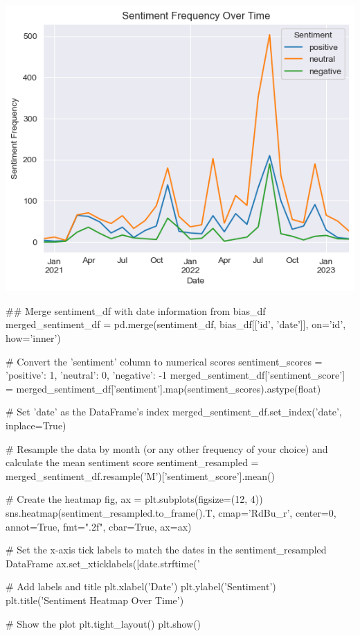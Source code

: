 \includegraphics[width=\textwidth]{./figs/fig_7.png}
\begin{pyin}
\## Merge sentiment_df with date information from bias_df
merged_sentiment_df = pd.merge(sentiment_df, bias_df[['id', 'date']], on='id', how='inner')

# Convert the 'sentiment' column to numerical scores
sentiment_scores = {'positive': 1, 'neutral': 0, 'negative': -1}
merged_sentiment_df['sentiment_score'] = merged_sentiment_df['sentiment'].map(sentiment_scores).astype(float)

# Set 'date' as the DataFrame's index
merged_sentiment_df.set_index('date', inplace=True)

# Resample the data by month (or any other frequency of your choice) and calculate the mean sentiment score
sentiment_resampled = merged_sentiment_df.resample('M')['sentiment_score'].mean()

# Create the heatmap
fig, ax = plt.subplots(figsize=(12, 4))
sns.heatmap(sentiment_resampled.to_frame().T, cmap='RdBu_r', center=0, annot=True, fmt=".2f", cbar=True, ax=ax)

# Set the x-axis tick labels to match the dates in the sentiment_resampled DataFrame
ax.set_xticklabels([date.strftime('%

# Add labels and title
plt.xlabel('Date')
plt.ylabel('Sentiment')
plt.title('Sentiment Heatmap Over Time')

# Show the plot
plt.tight_layout()
plt.show()
\end{pyin}

